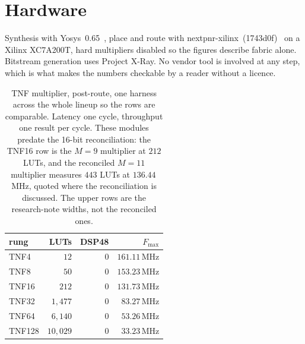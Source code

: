 \section{Hardware}\label{sec:hardware}

Synthesis with Yosys~0.65~\cite{yosys}, place and route with
nextpnr-xilinx~(1743d0f)~\cite{nextpnr} on a
Xilinx XC7A200T, hard multipliers disabled so the figures describe fabric alone.
Bitstream generation uses Project X-Ray. No vendor tool is involved at any step,
which is what makes the numbers checkable by a reader without a licence.

\begin{table}[t]\centering
\caption{TNF multiplier, post-route, one harness across the whole lineup so the
rows are comparable. Latency one cycle, throughput one result per cycle. These
modules predate the 16-bit reconciliation: the TNF16 row is the $M = 9$ multiplier
at $212$ LUTs, and the reconciled $M = 11$ multiplier measures $443$ LUTs at
$136.44$\,MHz, quoted where the reconciliation is discussed. The upper rows are the
research-note widths, not the reconciled ones.}
\label{tab:ladder}
\begin{tabular}{lrrr}
\toprule
rung & LUTs & DSP48 & $F_{\max}$ \\
\midrule
TNF4  & $12$      & $0$ & $161.11$\,MHz \\
TNF8  & $50$      & $0$ & $153.23$\,MHz \\
TNF16 & $212$     & $0$ & $131.73$\,MHz \\
TNF32  & $1{,}477$  & $0$ & $83.27$\,MHz \\
TNF64  & $6{,}140$  & $0$ & $53.26$\,MHz \\
TNF128 & $10{,}029$ & $0$ & $33.23$\,MHz \\
\bottomrule
\end{tabular}
\end{table}

